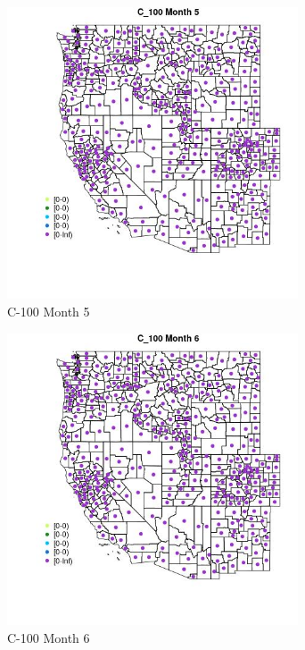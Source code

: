 \begin{figure} 
\centering  
\includegraphics[width=0.77\textwidth]{Code_Outputs/df_report_ML_predictors_CountyCentroid_Locations_Dates_2008-01-01to2018-12-31_MapObsMo5C_100.jpg} 
\caption{\label{fig:df_report_ML_predictors_CountyCentroid_Locations_Dates_2008-01-01to2018-12-31MapObsMo5C_100}C-100 Month 5} 
\end{figure} 
 

\begin{figure} 
\centering  
\includegraphics[width=0.77\textwidth]{Code_Outputs/df_report_ML_predictors_CountyCentroid_Locations_Dates_2008-01-01to2018-12-31_MapObsMo6C_100.jpg} 
\caption{\label{fig:df_report_ML_predictors_CountyCentroid_Locations_Dates_2008-01-01to2018-12-31MapObsMo6C_100}C-100 Month 6} 
\end{figure} 
 

